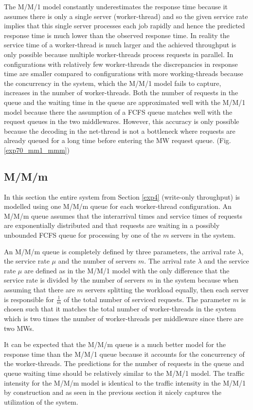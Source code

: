\documentclass[report.tex]{subfiles}
\begin{document}
The M/M/1 model constantly underestimates the response time because it assumes there is only a single server (worker-thread) and so the given service rate implies that this single server processes each job rapidly and hence the predicted response time is much lower than the observed response time. In reality the service time of a worker-thread is much larger and the achieved throughput is only possible because multiple worker-threads process requests in parallel.
In configurations with relatively few worker-threads the discrepancies in response time are smaller compared to configurations with more working-threads because the concurrency in the system, which the M/M/1 model fails to capture, increases in the number of worker-threads.
Both the number of requests in the queue and the waiting time in the queue are approximated well with the M/M/1 model because there the assumption of a FCFS queue matches well with the request queues in the two middlewares. However, this accuracy is only possible because the decoding in the net-thread is not a bottleneck where requests are already queued for a long time before entering the MW request queue. (Fig. \ref{exp70_mm1_mmm})

\subsection{M/M/m}

In this section the entire system from Section \ref{exp4} (write-only throughput) is modelled using one M/M/m queue for each worker-thread configuration. An M/M/m queue assumes that the interarrival times and service times of requests are exponentially distributed and that requests are waiting in a possibly unbounded FCFS queue for processing by one of the $m$ servers in the system.

An M/M/m queue is completely defined by three parameters, the arrival rate $\lambda$, the service rate $\mu$ and the number of servers $m$.
The arrival rate $\lambda$ and the service rate $\mu$ are defined as in the M/M/1 model with the only difference that the service rate is divided by the number of servers $m$ in the system because when assuming that there are $m$ servers splitting the workload equally, then each server is responsible for $\frac{1}{m}$ of the total number of serviced requests. The parameter $m$ is chosen such that it matches the total number of worker-threads in the system which is two times the number of worker-threads per middleware since there are two MWs.

It can be expected that the M/M/m queue is a much better model for the response time than the M/M/1 queue because it accounts for the concurrency of the worker-threads. The predictions for the number of requests in the queue and queue waiting time should be relatively similar to the M/M/1 model. The traffic intensity for the M/M/m model is identical to the traffic intensity in the M/M/1 by construction and as seen in the previous section it nicely captures the utilization of the system.
\end{document}
